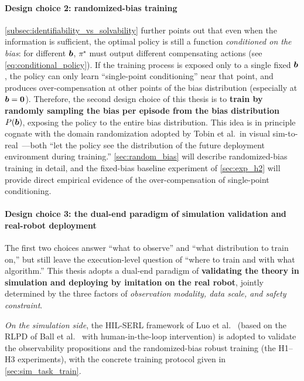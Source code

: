 \paragraph{Design choice 2: randomized-bias training} \cref{subsec:identifiability_vs_solvability} further points out that even when the information is sufficient, the optimal policy is still a function \emph{conditioned on the bias}: for different $\bm{b}$, $\pi^\star$ must output different compensating actions (see \cref{eq:conditional_policy}). If the training process is exposed only to a single fixed $\bm{b}$, the policy can only learn ``single-point conditioning'' near that point, and produces over-compensation at other points of the bias distribution (especially at $\bm{b}=\bm{0}$). Therefore, the second design choice of this thesis is to \textbf{train by randomly sampling the bias per episode from the bias distribution $P(\bm{b})$}, exposing the policy to the entire bias distribution. This idea is in principle cognate with the domain randomization adopted by Tobin et al.\ in visual sim-to-real~\cite{tobin2017domain}---both ``let the policy see the distribution of the future deployment environment during training.'' \cref{sec:random_bias} will describe randomized-bias training in detail, and the fixed-bias baseline experiment of \cref{sec:exp_h2} will provide direct empirical evidence of the over-compensation of single-point conditioning.

\paragraph{Design choice 3: the dual-end paradigm of simulation validation and real-robot deployment} The first two choices answer ``what to observe'' and ``what distribution to train on,'' but still leave the execution-level question of ``where to train and with what algorithm.'' This thesis adopts a dual-end paradigm of \textbf{validating the theory in simulation and deploying by imitation on the real robot}, jointly determined by the three factors of \emph{observation modality, data scale, and safety constraint}.

\emph{On the simulation side}, the HIL-SERL framework of Luo et al.~\cite{luo2025hilserl} (based on the RLPD of Ball et al.~\cite{ball2023rlpd} with human-in-the-loop intervention) is adopted to validate the observability propositions and the randomized-bias robust training (the H1--H3 experiments), with the concrete training protocol given in \cref{sec:sim_task_train}.

